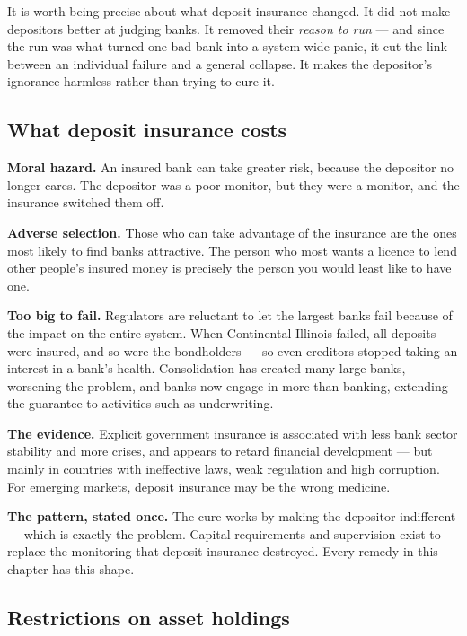\documentclass[11pt,a4paper]{article}
\newcommand{\keylab}[1]{\textcolor{ifclay}{\textbf{#1}}}
\begin{document}
It is worth being precise about what deposit insurance changed. It did not make
depositors better at judging banks. It removed their \emph{reason to run} ---
and since the run was what turned one bad bank into a system-wide panic, it cut
the link between an individual failure and a general collapse. It makes the
depositor's ignorance harmless rather than trying to cure it.

\subsection*{What deposit insurance costs}

\textbf{Moral hazard.} An insured bank can take greater risk, because the
depositor no longer cares. The depositor was a poor monitor, but they were a
monitor, and the insurance switched them off.

\textbf{Adverse selection.} Those who can take advantage of the insurance are
the ones most likely to find banks attractive. The person who most wants a
licence to lend other people's insured money is precisely the person you would
least like to have one.

\textbf{Too big to fail.} Regulators are reluctant to let the largest banks fail
because of the impact on the entire system. When Continental Illinois failed,
all deposits were insured, and so were the bondholders --- so even creditors
stopped taking an interest in a bank's health. Consolidation has created many
large banks, worsening the problem, and banks now engage in more than banking,
extending the guarantee to activities such as underwriting.

\textbf{The evidence.} Explicit government insurance is associated with less
bank sector stability and more crises, and appears to retard financial
development --- but mainly in countries with ineffective laws, weak regulation
and high corruption. For emerging markets, deposit insurance may be the wrong
medicine.

\begin{keybox}
\keylab{The pattern, stated once.} The cure works by making the depositor
indifferent --- which is exactly the problem. Capital requirements and
supervision exist to replace the monitoring that deposit insurance destroyed.
Every remedy in this chapter has this shape.
\end{keybox}

\subsection*{Restrictions on asset holdings}
\end{document}

